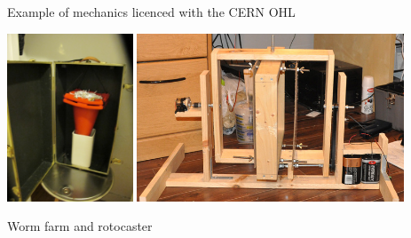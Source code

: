\documentclass[compress,red]{beamer}
\begin{document}
%
%
%



\begin{frame}{Example of mechanics licenced with the CERN OHL}
 \begin{center}
   \includegraphics[height=5cm]{worm-farm-008.jpg}
   \includegraphics[height=5cm]{rotocaster.jpg}

Worm farm and rotocaster
 \end{center} 
\end{frame}
\end{document}
